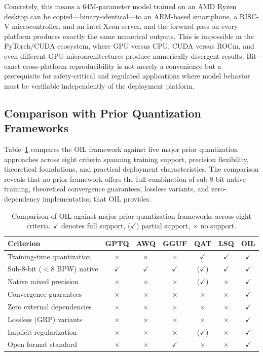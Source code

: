 Concretely, this means a 64M-parameter model trained on an AMD Ryzen desktop can be copied---binary-identical---to an ARM-based smartphone, a RISC-V microcontroller, and an Intel Xeon server, and the forward pass on every platform produces exactly the same numerical outputs. This is impossible in the PyTorch/CUDA ecosystem, where GPU versus CPU, CUDA versus ROCm, and even different GPU microarchitectures produce numerically divergent results. Bit-exact cross-platform reproducibility is not merely a convenience but a prerequisite for safety-critical and regulated applications where model behavior must be verifiable independently of the deployment platform.

\subsection{Comparison with Prior Quantization Frameworks}

Table~\ref{tab:comparison_prior} compares the OIL framework against five major prior quantization approaches across eight criteria spanning training support, precision flexibility, theoretical foundations, and practical deployment characteristics. The comparison reveals that no prior framework offers the full combination of sub-8-bit native training, theoretical convergence guarantees, lossless variants, and zero-dependency implementation that OIL provides.

\begin{table}[htbp]
\centering
{}
\caption{Comparison of OIL against major prior quantization frameworks across eight criteria. $\checkmark$ denotes full support, ($\checkmark$) partial support, $\times$ no support.}
\label{tab:comparison_prior}
\begin{tabular}{lcccccc}
\toprule
\textbf{Criterion} & \textbf{GPTQ} & \textbf{AWQ} & \textbf{GGUF} & \textbf{QAT} & \textbf{LSQ} & \textbf{OIL} \\
\midrule
Training-time quantization & $\times$ & $\times$ & $\times$ & $\checkmark$ & $\checkmark$ & $\checkmark$ \\
Sub-8-bit ($< 8$ BPW) native & $\checkmark$ & $\checkmark$ & $\checkmark$ & ($\checkmark$) & $\checkmark$ & $\checkmark$ \\
Native mixed precision & $\times$ & $\times$ & $\times$ & ($\checkmark$) & $\times$ & $\checkmark$ \\
Convergence guarantees & $\times$ & $\times$ & $\times$ & $\times$ & $\times$ & $\checkmark$ \\
Zero external dependencies & $\times$ & $\times$ & $\times$ & $\times$ & $\times$ & $\checkmark$ \\
Lossless (GRP) variants & $\times$ & $\times$ & $\times$ & $\times$ & $\times$ & $\checkmark$ \\
Implicit regularization & $\times$ & $\times$ & $\times$ & ($\checkmark$) & $\times$ & $\checkmark$ \\
Open format standard & $\times$ & $\times$ & $\checkmark$ & $\times$ & $\times$ & $\checkmark$ \\
\bottomrule
\end{tabular}
\end{table}

